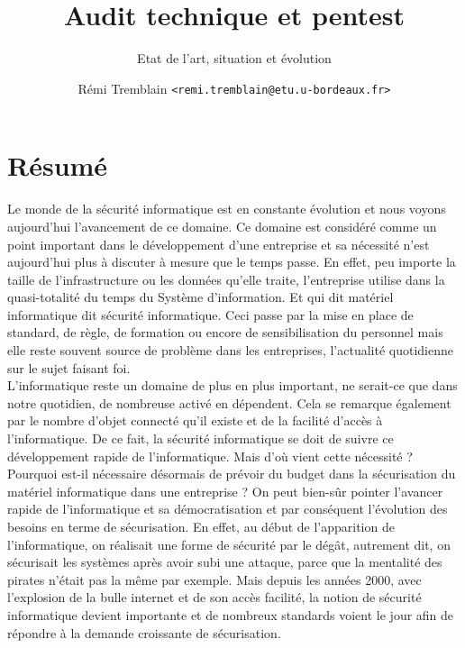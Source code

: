 \documentclass[a4paper]{memoir}
\title{Audit technique et pentest}
\subtitle{Etat de l'art, situation et évolution}
\author{Rémi Tremblain \texttt{<remi.tremblain@etu.u-bordeaux.fr>}}
\begin{document}
\frontmatter%
\maketitle
\thispagestyle{empty}





\chapter*{Résumé}


Le monde de la sécurité informatique est en constante évolution et nous voyons aujourd'hui l'avancement de ce domaine.
Ce domaine est considéré comme un point important dans le développement d'une entreprise et sa nécessité n'est aujourd'hui plus à discuter à mesure que le temps passe. En effet, peu importe la taille de l'infrastructure ou les données qu'elle traite, l'entreprise utilise dans la quasi-totalité du temps du Système d'information. Et qui dit matériel informatique dit sécurité informatique. Ceci passe par la mise en place de standard, de règle, de formation ou encore de sensibilisation du personnel mais elle reste souvent source de problème dans les entreprises, l'actualité quotidienne sur le sujet faisant foi.\\

L'informatique reste un domaine de plus en plus important, ne serait-ce que dans notre quotidien, de nombreuse activé en dépendent. Cela se remarque également par le nombre d'objet connecté qu'il existe et de la facilité d'accès à l'informatique. De ce fait, la sécurité informatique se doit de suivre ce développement rapide de l'informatique. Mais d'où vient cette nécessité ? Pourquoi est-il nécessaire désormais de prévoir du budget dans la sécurisation du matériel informatique dans une entreprise ? On peut bien-sûr pointer l'avancer rapide de l'informatique et sa démocratisation et par conséquent l'évolution des besoins en terme de sécurisation. En effet, au début de l'apparition de l'informatique, on réalisait une forme de sécurité par le dégât, autrement dit, on sécurisait les systèmes après avoir subi une attaque, parce que la mentalité des pirates n'était pas la même par exemple.
Mais depuis les années 2000, avec l'explosion de la bulle internet et de son accès facilité, la notion de sécurité informatique devient importante et de nombreux standards voient le jour afin de répondre à la demande croissante de sécurisation.
\end{document}
